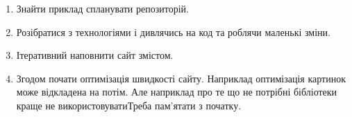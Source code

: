 \begin{enumerate}
    \item Знайти приклад спланувати репозиторій.
    \item Розібратися з технологіями і дивлячись на код та роблячи маленькі зміни.
    \item Ітеративний наповнити сайт змістом.
    \item Згодом почати оптимізація швидкості сайту. Наприклад оптимізація картинок може відкладена на потім. Але наприклад про те що не потрібні бібліотеки краще не використовуватиТреба пам'ятати з початку.
\end{enumerate}
